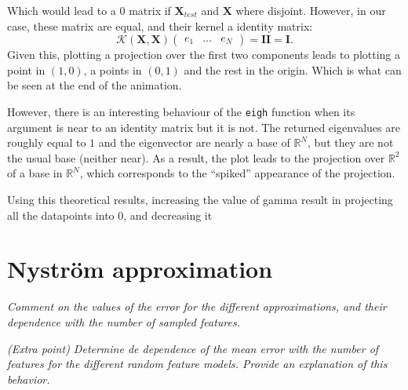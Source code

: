 \documentclass[11pt]{article}
\begin{document}
Which would lead to a \( 0 \) matrix if \( \bm{X}_{test} \) and \( \bm{X} \) where disjoint. However, in our case, these matrix are equal, and their kernel a identity matrix:
\[
      \mathcal{K}(\bm{X}, \bm{X})\begin{pmatrix} e_1 & \dots & e_N \end{pmatrix} = \bm{I}\bm{I} =  \bm{I}.
\]
Given this, plotting a projection over the first two components leads to plotting a point in \( (1,0) \), a points in \( (0,1) \) and the rest in the origin. Which is what can be seen at the end of the animation.

However, there is an interesting behaviour of the \texttt{eigh} function when its argument is near to an identity matrix but it is not. The returned eigenvalues are roughly equal to \( 1 \) and the eigenvector are nearly a base of \( \mathbb{R}^N \), but they are not the usual base (neither near). As a result, the plot leads to the projection over \( \mathbb{R}^2\) of a base in \( \mathbb{R}^N \), which corresponds to the ``spiked''  appearance of the projection.




Using this theoretical results, increasing the value of gamma result in projecting all the datapoints into \( 0 \), and decreasing it

\section*{Nyström approximation}

\emph{Comment on the values of the error for the different approximations, and their dependence with the number of sampled features.}

\emph{(Extra point) Determine de dependence of the mean error with the number of features for the different random feature models. Provide an explanation of this behavior.}
\end{document}
